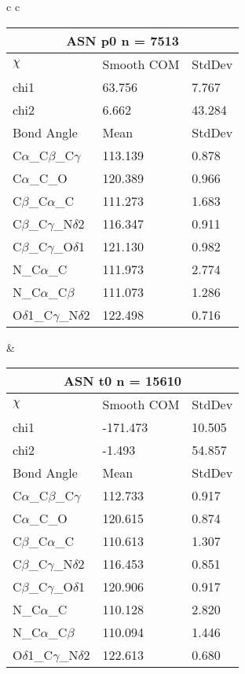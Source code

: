 \begin{longtable}{ c c }

  \begin{tabular}{ l l l }
  \toprule
  \multicolumn{3}{c}{ASN \textbf{p0} n = 7513} \\ \toprule
  $\chi$       & Smooth COM & StdDev \\ \midrule
  chi1 & 63.756 & 7.767 \\ 
  chi2 & 6.662 & 43.284 \\ \midrule
  Bond Angle   & Mean     & StdDev \\ \midrule
  C$\alpha$\_C$\beta$\_C$\gamma$ & 113.139 & 0.878\\
  C$\alpha$\_C\_O & 120.389 & 0.966\\
  C$\beta$\_C$\alpha$\_C & 111.273 & 1.683\\
  C$\beta$\_C$\gamma$\_N$\delta$2 & 116.347 & 0.911\\
  C$\beta$\_C$\gamma$\_O$\delta$1 & 121.130 & 0.982\\
  N\_C$\alpha$\_C & 111.973 & 2.774\\
  N\_C$\alpha$\_C$\beta$ & 111.073 & 1.286\\
  O$\delta$1\_C$\gamma$\_N$\delta$2 & 122.498 & 0.716\\
  \bottomrule
  \end{tabular}
  &
  \begin{tabular}{ l l l }
  \toprule
  \multicolumn{3}{c}{ASN \textbf{t0} n = 15610} \\ \toprule
  $\chi$       & Smooth COM & StdDev \\ \midrule
  chi1 & -171.473 & 10.505 \\ 
  chi2 & -1.493 & 54.857 \\ \midrule
  Bond Angle   & Mean     & StdDev \\ \midrule
  C$\alpha$\_C$\beta$\_C$\gamma$ & 112.733 & 0.917\\
  C$\alpha$\_C\_O & 120.615 & 0.874\\
  C$\beta$\_C$\alpha$\_C & 110.613 & 1.307\\
  C$\beta$\_C$\gamma$\_N$\delta$2 & 116.453 & 0.851\\
  C$\beta$\_C$\gamma$\_O$\delta$1 & 120.906 & 0.917\\
  N\_C$\alpha$\_C & 110.128 & 2.820\\
  N\_C$\alpha$\_C$\beta$ & 110.094 & 1.446\\
  O$\delta$1\_C$\gamma$\_N$\delta$2 & 122.613 & 0.680\\
  \bottomrule
  \end{tabular}

\end{longtable}
